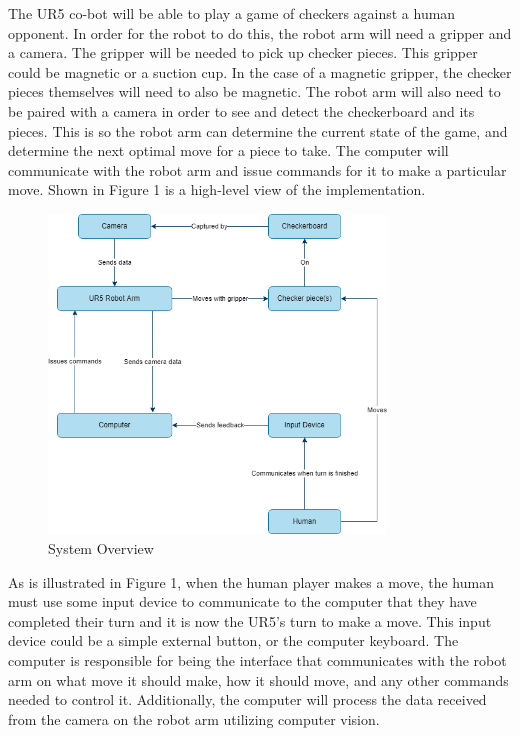 The UR5 co-bot will be able to play a game of checkers against a human opponent. In order for the robot to do this, the robot arm will need a gripper and a camera. The gripper will be needed to pick up checker pieces. This gripper could be magnetic or a suction cup. In the case of a magnetic gripper, the checker pieces themselves will need to also be magnetic. The robot arm will also need to be paired with a camera in order to see and detect the checkerboard and its pieces. This is so the robot arm can determine the current state of the game, and determine the next optimal move for a piece to take. The computer will communicate with the robot arm and issue commands for it to make a particular move. Shown in Figure 1 is a high-level view of the implementation.

\begin{figure}[h!]
    \centering
    \includegraphics[width=0.8\textwidth]{images/system-overview.drawio.png}
    \caption{System Overview}
\end{figure}

As is illustrated in Figure 1, when the human player makes a move, the human must use some input device to communicate to the computer that they have completed their turn and it is now the UR5's turn to make a move. This input device could be a simple external button, or the computer keyboard. The computer is responsible for being the interface that communicates with the robot arm on what move it should make, how it should move, and any other commands needed to control it. Additionally, the computer will process the data received from the camera on the robot arm utilizing computer vision.

